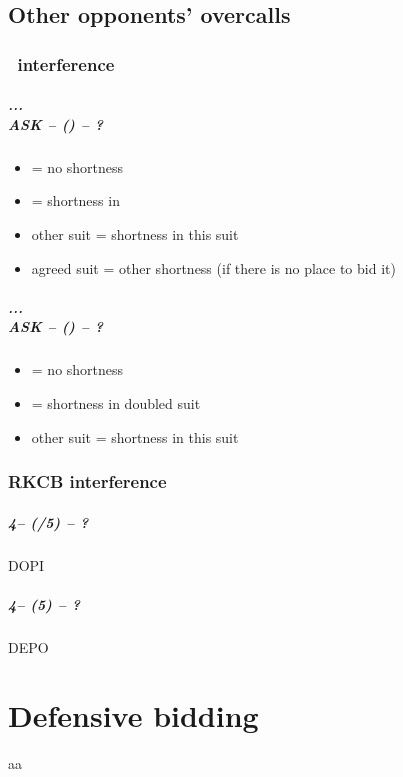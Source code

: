 \documentclass[12pt, a4paper]{report}
\begin{document}
\chapter*{\colorbox{Plum!30}{Other opponents' overcalls}}

\section*{\colorbox{blue!30}{\hsf\ interference}}

\subsubsection*{...\\{\color{WildStrawberry}\textbf{ASK}\color{black}} -- (\anysuit{\textbullet}) -- ?}
\begin{itemize}
    \item \dbl = no shortness
    \item \pass = shortness in \anysuit{\textbullet}
    \item other suit = shortness in this suit
    \item agreed suit = other shortness (if there is no place to bid it)
\end{itemize}

\subsubsection*{...\\{\color{WildStrawberry}\textbf{ASK}\color{black}} -- (\dbl) -- ?}
\begin{itemize}
    \item \rdbl = no shortness
    \item \pass = shortness in doubled suit
    \item other suit = shortness in this suit
\end{itemize}

\section*{\colorbox{blue!30}{RKCB interference}}

\subsubsection*{4\nt -- (\dbl/5\minor) -- ?}
DOPI

\subsubsection*{4\nt -- (5\major) -- ?}
DEPO

\part*{\colorbox{RoyalPurple!30}{Defensive bidding}}

aa
\end{document}
